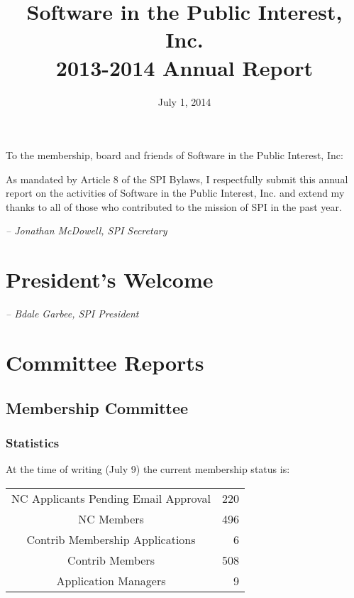 \documentclass[letterpaper]{report}
\begin{document}
\title{Software in the Public Interest, Inc.\\
2013-2014 Annual Report}
\date{July 1, 2014}

\maketitle

To the membership, board and friends of Software in the Public Interest, Inc:

As mandated by Article 8 of the SPI Bylaws, I respectfully submit this annual
report on the activities of Software in the Public Interest, Inc. and extend my
thanks to all of those who contributed to the mission of SPI in the past year.

  \emph{-- Jonathan McDowell, SPI Secretary}

\newpage

\tableofcontents

\newpage

\chapter{President's Welcome}
\label{sec:president}

  \emph{-- Bdale Garbee, SPI President}

\chapter{Committee Reports}
\section{Membership Committee}

\subsection{Statistics}

At the time of writing (July 9) the current membership status is:

\begin{tabular}{ | c | r | }
\hline
NC Applicants Pending Email Approval	& 220 \\
NC Members				& 496 \\
Contrib Membership Applications		& 6 \\
Contrib Members				& 508 \\
Application Managers			& 9 \\
\hline
\end{tabular}
\end{document}
